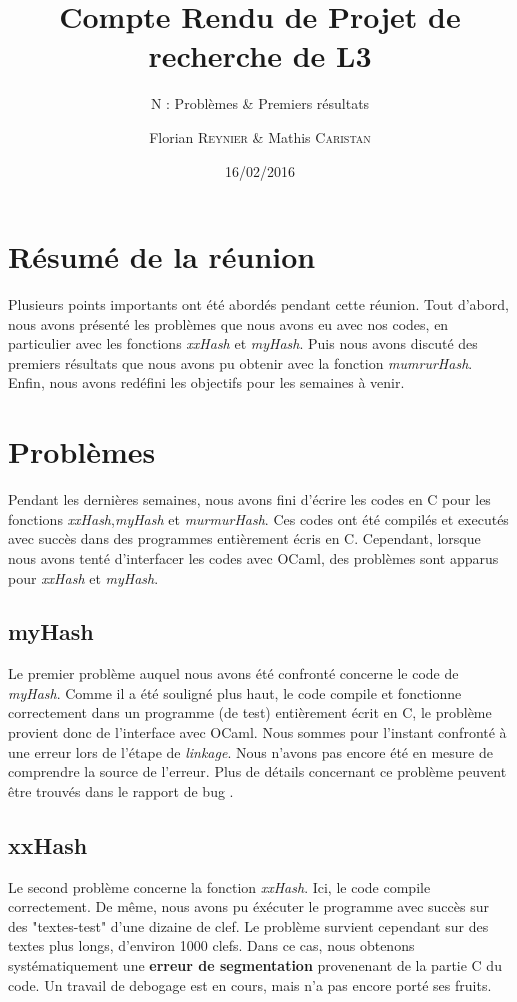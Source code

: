 \documentclass[final,twoside,article,10pt]{scrartcl}
\begin{document}
%
\title{Compte Rendu de Projet de recherche de L3}
\subtitle{N : Problèmes \& Premiers résultats}
\author{Florian \textsc{Reynier} \& Mathis \textsc{Caristan}}
%
\date{16/02/2016}

\maketitle

\section*{Résumé de la réunion}
    Plusieurs points importants ont été abordés pendant cette réunion.
    Tout d'abord, nous avons présenté les problèmes que nous avons eu avec nos codes, en particulier avec les fonctions \textit{xxHash} et \textit{myHash}.
    Puis nous avons discuté des premiers résultats que nous avons pu obtenir avec la fonction \textit{mumrurHash}.
    Enfin, nous avons redéfini les objectifs pour les semaines à venir.

\section{Problèmes}
    Pendant les dernières semaines, nous avons fini d'écrire les codes en C pour les fonctions \textit{xxHash},\textit{myHash} et \textit{murmurHash}. Ces codes ont été compilés et executés avec succès dans des programmes entièrement écris en C. Cependant, lorsque nous avons tenté d'interfacer les codes avec OCaml, des problèmes sont apparus pour \textit{xxHash} et \textit{myHash}.
    \subsection{myHash}
        Le premier problème auquel nous avons été confronté concerne le code de \textit{myHash}.
        Comme il a été souligné plus haut, le code compile et fonctionne correctement dans un programme (de test) entièrement écrit en C, le problème provient donc de l'interface avec OCaml.
        Nous sommes pour l'instant confronté à une erreur lors de l'étape de \emph{linkage}. Nous n'avons pas encore été en mesure de comprendre la source de l'erreur. Plus de détails concernant ce problème peuvent être trouvés dans le rapport de bug \cite{bug}.
    \subsection{xxHash}
        Le second problème concerne la fonction \textit{xxHash}.
        Ici, le code compile correctement. De même, nous avons pu éxécuter le programme avec succès sur des "textes-test" d'une dizaine de clef. Le problème survient cependant sur des textes plus longs, d'environ 1000 clefs. Dans ce cas, nous obtenons systématiquement une \textbf{erreur de segmentation} provenenant de la partie C du code.
        Un travail de debogage est en cours, mais n'a pas encore porté ses fruits.
\end{document}
